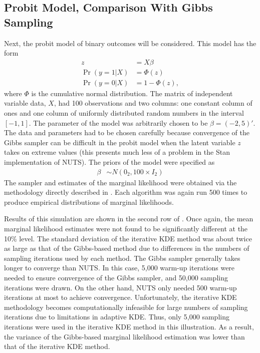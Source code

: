\documentclass[twocolumn]{article}
\begin{document}
\subsection{Probit Model, Comparison With Gibbs Sampling}

Next, the probit model of binary outcomes will be considered. This model has the form
\begin{subequations}
\begin{align}
	z &= X\beta \\
	\Pr(y=1|X) &= \Phi(z) \\
	\Pr(y=0|X) &= 1 - \Phi(z),
\end{align}
\end{subequations}
where $\Phi$ is the cumulative normal distribution. The matrix of independent variable data, $X$, had 100 observations and two columns: one constant column of ones and one column of uniformly distributed random numbers in the interval $[-1, 1]$. The parameter of the model was arbitrarily chosen to be $\beta = (-2, 5)'$. The data and parameters had to be chosen carefully because convergence of the Gibbs sampler can be difficult in the probit model when the latent variable $z$ takes on extreme values (this presents much less of a problem in the Stan implementation of NUTS). The priors of the model were specified as
\begin{align}
	\beta &\sim N(0_2, 100 \times I_2)
\end{align}
The sampler and estimates of the marginal likelihood were obtained via the methodology directly described in \cite{Chib}. Each algorithm was again run 500 times to produce empirical distributions of marginal likelihoods.

Results of this simulation are shown in the second row of . Once again, the mean marginal likelihood estimates were not found to be significantly different at the 10\% level. The standard deviation of the iterative KDE method was about twice as large as that of the Gibbs-based method due to differences in the numbers of sampling iterations used by each method. The Gibbs sampler generally takes longer to converge than NUTS. In this case, 5,000 warm-up iterations were needed to ensure convergence of the Gibbs sampler, and 50,000 sampling iterations were drawn. On the other hand, NUTS only needed 500 warm-up iterations at most to achieve convergence. Unfortunately, the iterative KDE methodology becomes computationally infeasible for large numbers of sampling iterations due to limitations in adaptive KDE. Thus, only 5,000 sampling iterations were used in the iterative KDE method in this illustration. As a result, the variance of the Gibbs-based marginal likelihood estimation was lower than that of the iterative KDE method.
\end{document}
